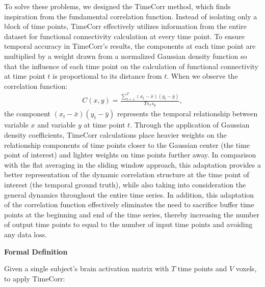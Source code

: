 \documentclass[11pt]{article}
\begin{document}
To solve these problems, we designed the TimeCorr method, which finds inspiration from the fundamental correlation function. Instead of isolating only a block of time points, TimeCorr effectively utilizes information from the entire dataset for functional connectivity calculation at every time point. To ensure temporal accuracy in TimeCorr's results, the components at each time point are multiplied by a weight drawn from a normalized Gaussian density function so that the influence of each time point on the calculation of functional connectivity at time point $t$ is proportional to its distance from $t$. When we observe the correlation function:
\begin{align*}
C(x,y) = \frac{\sum_{t=1}^T (x_t-\bar{x})(y_t-\bar{y})}{Ts_xs_y},
\end{align*}
the component $(x_t-\bar{x})(y_t-\bar{y})$ represents the temporal relationship between variable $x$ and variable $y$ at time point $t$. Through the application of Gaussian density coefficients, TimeCorr calculations place heavier weights on the relationship components of time points closer to the Gaussian center (the time point of interest) and lighter weights on time points further away. In comparison with the flat averaging in the sliding window approach, this adaptation provides a better representation of the dynamic correlation structure at the time point of interest (the temporal ground truth), while also taking into consideration the general dynamics throughout the entire time series. In addition, this adaptation of the correlation function effectively eliminates the need to sacrifice buffer time points at the beginning and end of the time series, thereby increasing the number of output time points to equal to the number of input time points and avoiding any data loss.

\large{\textbf{Formal Definition}}

\normalsize
Given a single subject's brain activation matrix with $T$ time points and $V$ voxels, to apply TimeCorr:
\end{document}
